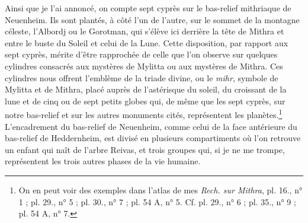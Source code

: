 \documentclass{article}
\begin{document}
Ainsi que je l'ai annoncé, on compte sept cyprès sur le bas-relief mithriaque de Neuenheim. Ils sont plantés, à côté l'un de l'autre, sur le sommet de la montagne céleste, l'Albordj ou le Gorotman, qui s'élève ici derrière la tête de Mithra et entre le buste du Soleil et celui de la Lune. Cette disposition, par rapport aux sept cyprès, mérite d'être rapprochée de celle que l'on observe sur quelques cylindres consacrés aux mystères de Mylitta ou aux mystères de Mithra. Ces cylindres nous offrent l'emblème de la triade divine, ou le \emph{mihr}, symbole de Mylitta et de Mithra, placé auprès de l'astérisque du soleil, du croissant de la lune et de cinq ou de sept petits globes qui, de même que les sept cyprès, sur notre bas-relief et sur les autres monuments cités, représentent les planètes.\footnote{On en peut voir des exemples dans l'atlas de mes \emph{Rech. sur Mithra}, pl. 16., n° 1 ; pl. 29., n° 5 ; pl. 30., n° 7 ; pl. 54 A, n° 5. Cf. pl. 29., n° 6 ; pl. 35., n° 9 ; pl. 54 A, n° 7.} L'encadrement du bas-relief de Neuenheim, comme celui de la face antérieure du bas-relief de Heddernheim, est divisé en plusieurs compartiments où l'on retrouve un enfant qui naît de l'arbre Reivas, et trois groupes qui, si je ne me trompe, représentent les trois autres phases de la vie humaine.
\end{document}

